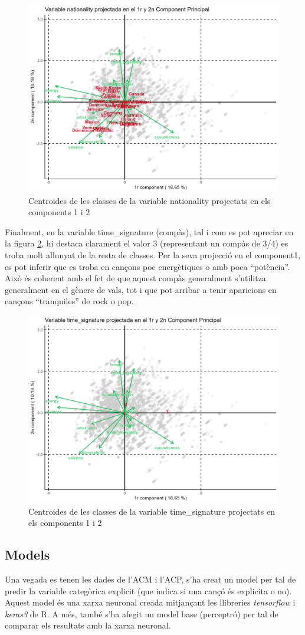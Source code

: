 \begin{figure}[H]
    \centering
    \includegraphics[width=0.6\linewidth]{Images/6_Factorial_Methods/ACP/Cat_C1_C2_nationality.png}
    \caption{Centroides de les classes de la variable nationality projectats en els components 1 i 2}
    \label{fig:6_FM:ACP_nationality}
\end{figure}

Finalment, en la variable time\_signature (compàs), tal i com es pot apreciar en la figura \ref{fig:6_FM:ACP_timesignature}, hi destaca clarament el valor 3 (representant un compàs de 3/4) es troba molt allunyat de la resta de classes. Per la seva projecció en el component1, es pot inferir que es troba en cançons poc energètiques o amb poca ``potència''. Això és coherent amb el fet de que aquest compàs generalment s'utilitza generalment en el gènere de vals, tot i que pot arribar a tenir aparicions en cançons ``tranquiles'' de rock o pop.
\begin{figure}[H]
    \centering
    \includegraphics[width=0.6\linewidth]{Images/6_Factorial_Methods/ACP/Cat_C1_C2_time_signature.png}
    \caption{Centroides de les classes de la variable time\_signature projectats en els components 1 i 2}
    \label{fig:6_FM:ACP_timesignature}
\end{figure}

\subsection{Models}
Una vegada es tenen les dades de l'ACM i l'ACP, s'ha creat un model per tal de predir la variable categòrica explicit (que indica si una cançó és explicita o no). Aquest model és una xarxa neuronal creada mitjançant les llibreries \textit{tensorflow} i \textit{keras3} de R. A més, també s'ha afegit un model base (perceptró) per tal de comparar els resultats amb la xarxa neuronal.

